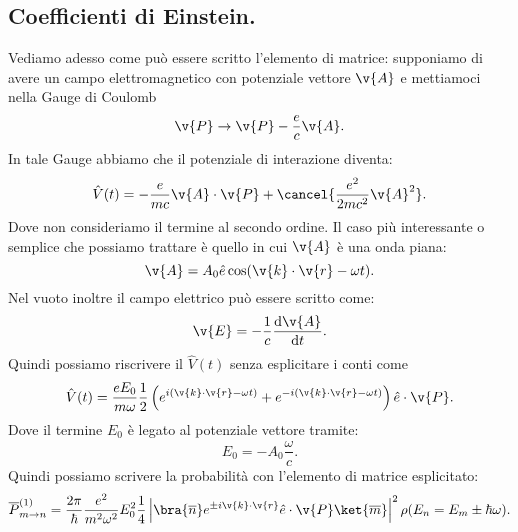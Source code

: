 \subsection{Coefficienti di Einstein.}%
\label{sub:Coefficienti di Einstein.}
Vediamo adesso come può essere scritto l'elemento di matrice: supponiamo di avere un campo elettromagnetico con potenziale vettore $\v{A}$ e mettiamoci nella Gauge di Coulomb
\[
    \v{P} \to 
\v{P}- \frac{e}{c}\v{A}
.\] 
In tale Gauge abbiamo che il potenziale di interazione diventa:
\[
    \hat{V}(t) = -\frac{e}{mc}\v{A}\cdot \v{P} + \cancel{\frac{e^2}{2mc^2}\v{A}^2}
.\] 
Dove non consideriamo il termine al secondo ordine. Il caso più interessante o semplice che possiamo trattare è quello in cui $\v{A}$ è una onda piana:
\[
    \v{A}=A_0 \hat{e}\cos(\v{k}\cdot \v{r}-\omega t) 
.\] 
Nel vuoto inoltre il campo elettrico può essere scritto come:
\[
\v{E}= -\frac{1}{c}\frac{\text{d} \v{A}}{\text{d} t} 
.\] 
Quindi possiamo riscrivere il $\hat{V}(t) $ senza esplicitare i conti come 
\[
    \hat{V}(t) = \frac{eE_0}{m\omega} \frac{1}{2}\left(e^{i(\v{k}\cdot \v{r}-\omega t)} + e^{-i(\v{k}\cdot \v{r}-\omega t) }\right) \hat{e}\cdot \v{P}
.\] 
Dove il termine $E_0$  è legato al potenziale vettore tramite:
\[
E_0=-A_0 \frac{\omega}{c}
.\] 
Quindi possiamo scrivere la probabilità con l'elemento di matrice esplicitato:
\[
    \overline{P}^{(1)}_{m\to n}=
    \frac{2\pi}{\hbar }\frac{e^2}{m^2\omega^2}E_0^2 \frac{1}{4}
    \left|
    \bra{\overline{n}}
    e^{\pm i \v{k}\cdot \v{r}}\hat{e}\cdot \v{P} 
    \ket{\overline{m}}
    \right|^2\rho(E_n = E_m \pm \hbar \omega) 
.\] 
